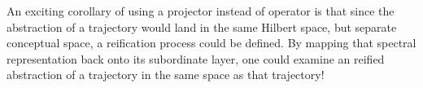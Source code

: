 An exciting corollary of using a projector instead of operator is that since the abstraction of a trajectory would land in the same Hilbert space, but separate conceptual space, a reification process could be defined.  By mapping that spectral representation back onto its subordinate layer, one could examine an reified abstraction of a trajectory in the same space as that trajectory!


